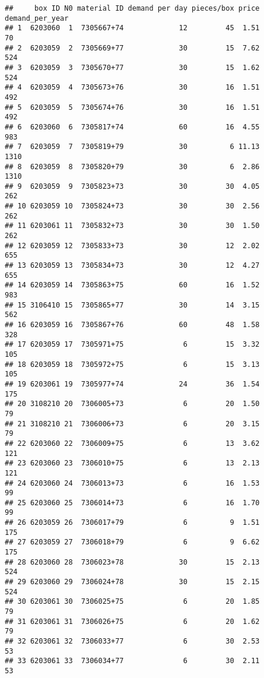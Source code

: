 \documentclass[
]{article}
\begin{document}
\begin{verbatim}
##     box ID N0 material ID demand per day pieces/box price demand_per_year
## 1  6203060  1  7305667+74             12         45  1.51              70
## 2  6203059  2  7305669+77             30         15  7.62             524
## 3  6203059  3  7305670+77             30         15  1.62             524
## 4  6203059  4  7305673+76             30         16  1.51             492
## 5  6203059  5  7305674+76             30         16  1.51             492
## 6  6203060  6  7305817+74             60         16  4.55             983
## 7  6203059  7  7305819+79             30          6 11.13            1310
## 8  6203059  8  7305820+79             30          6  2.86            1310
## 9  6203059  9  7305823+73             30         30  4.05             262
## 10 6203059 10  7305824+73             30         30  2.56             262
## 11 6203061 11  7305832+73             30         30  1.50             262
## 12 6203059 12  7305833+73             30         12  2.02             655
## 13 6203059 13  7305834+73             30         12  4.27             655
## 14 6203059 14  7305863+75             60         16  1.52             983
## 15 3106410 15  7305865+77             30         14  3.15             562
## 16 6203059 16  7305867+76             60         48  1.58             328
## 17 6203059 17  7305971+75              6         15  3.32             105
## 18 6203059 18  7305972+75              6         15  3.13             105
## 19 6203061 19  7305977+74             24         36  1.54             175
## 20 3108210 20  7306005+73              6         20  1.50              79
## 21 3108210 21  7306006+73              6         20  3.15              79
## 22 6203060 22  7306009+75              6         13  3.62             121
## 23 6203060 23  7306010+75              6         13  2.13             121
## 24 6203060 24  7306013+73              6         16  1.53              99
## 25 6203060 25  7306014+73              6         16  1.70              99
## 26 6203059 26  7306017+79              6          9  1.51             175
## 27 6203059 27  7306018+79              6          9  6.62             175
## 28 6203060 28  7306023+78             30         15  2.13             524
## 29 6203060 29  7306024+78             30         15  2.15             524
## 30 6203061 30  7306025+75              6         20  1.85              79
## 31 6203061 31  7306026+75              6         20  1.62              79
## 32 6203061 32  7306033+77              6         30  2.53              53
## 33 6203061 33  7306034+77              6         30  2.11              53

\end{verbatim}
\end{document}
